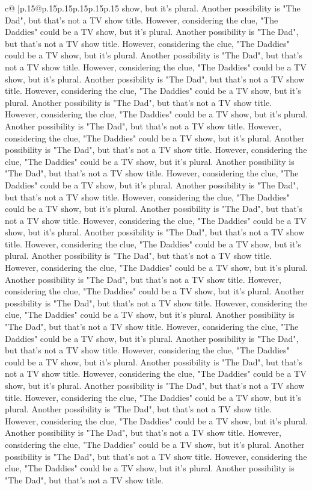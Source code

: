 \documentclass{article}
\begin{document}
{\begin{supertabular}{c@{$\;$}|p{.15\linewidth}@{}p{.15\linewidth}p{.15\linewidth}p{.15\linewidth}p{.15\linewidth}p{.15\linewidth}}
{{{show, but it's plural. Another possibility is "The Dad", but that's not a TV show title. However, considering the clue, "The Daddies" could be a TV show, but it's plural. Another possibility is "The Dad", but that's not a TV show title. However, considering the clue, "The Daddies" could be a TV show, but it's plural. Another possibility is "The Dad", but that's not a TV show title. However, considering the clue, "The Daddies" could be a TV show, but it's plural. Another possibility is "The Dad", but that's not a TV show title. However, considering the clue, "The Daddies" could be a TV show, but it's plural. Another possibility is "The Dad", but that's not a TV show title. However, considering the clue, "The Daddies" could be a TV show, but it's plural. Another possibility is "The Dad", but that's not a TV show title. However, considering the clue, "The Daddies" could be a TV show, but it's plural. Another possibility is "The Dad", but that's not a TV show title. However, considering the clue, "The Daddies" could be a TV show, but it's plural. Another possibility is "The Dad", but that's not a TV show title. However, considering the clue, "The Daddies" could be a TV show, but it's plural. Another possibility is "The Dad", but that's not a TV show title. However, considering the clue, "The Daddies" could be a TV show, but it's plural. Another possibility is "The Dad", but that's not a TV show title. However, considering the clue, "The Daddies" could be a TV show, but it's plural. Another possibility is "The Dad", but that's not a TV show title. However, considering the clue, "The Daddies" could be a TV show, but it's plural. Another possibility is "The Dad", but that's not a TV show title. However, considering the clue, "The Daddies" could be a TV show, but it's plural. Another possibility is "The Dad", but that's not a TV show title. However, considering the clue, "The Daddies" could be a TV show, but it's plural. Another possibility is "The Dad", but that's not a TV show title. However, considering the clue, "The Daddies" could be a TV show, but it's plural. Another possibility is "The Dad", but that's not a TV show title. However, considering the clue, "The Daddies" could be a TV show, but it's plural. Another possibility is "The Dad", but that's not a TV show title. However, considering the clue, "The Daddies" could be a TV show, but it's plural. Another possibility is "The Dad", but that's not a TV show title. However, considering the clue, "The Daddies" could be a TV show, but it's plural. Another possibility is "The Dad", but that's not a TV show title. However, considering the clue, "The Daddies" could be a TV show, but it's plural. Another possibility is "The Dad", but that's not a TV show title. However, considering the clue, "The Daddies" could be a TV show, but it's plural. Another possibility is "The Dad", but that's not a TV show title. However, considering the clue, "The Daddies" could be a TV show, but it's plural. Another possibility is "The Dad", but that's not a TV show title. However, considering the clue, "The Daddies" could be a TV show, but it's plural. Another possibility is "The Dad", but that's not a TV show title. }}}
\end{supertabular}}
\end{document}
